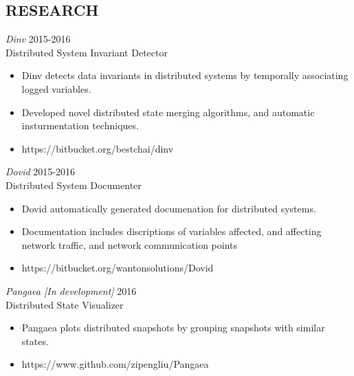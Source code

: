 \documentclass[line,margin]{res}
\begin{document}
\address{3549 Puget Drive, Vancouver, BC }
\address{(604) 970-2469}
\address{sgrant09@cs.ubc.ca}
\begin{resume}
\section{RESEARCH}
{\sl Dinv} \hfill 2015-2016\\
    Distributed System Invariant Detector
\begin{itemize} \itemsep -2pt
        \item Dinv detects data invariants in distributed systems by temporally associating logged variables.
        \item Developed novel distributed state merging algorithms, and automatic insturmentation techniques.
        \item https://bitbucket.org/bestchai/dinv
\end{itemize}

{\sl Dovid} \hfill 2015-2016\\
    Distributed System Documenter
\begin{itemize} \itemsep -2pt
        \item Dovid automatically generated documenation for distributed systems.
        \item Documentation includes discriptions of variables affected, and affecting network traffic, and network communication points
        \item https://bitbucket.org/wantonsolutions/Dovid
\end{itemize}

{\sl Pangaea [In development]} \hfill 2016\\
    Distributed State Visualizer
\begin{itemize} \itemsep -2pt
        \item Pangaea plots distributed snapshots by grouping snapshots with similar states.
        \item https://www.github.com/zipengliu/Pangaea
\end{itemize}


\end{resume}
\end{document}
